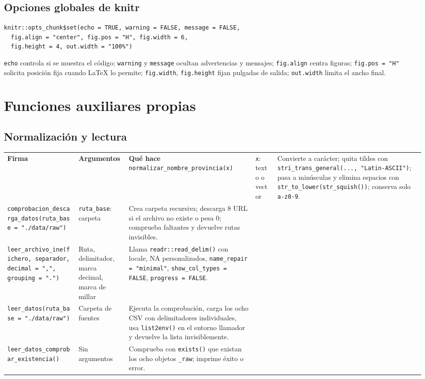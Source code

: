 \documentclass[10pt,a4paper]{article}
\newcommand{\code}[1]{\texttt{\small #1}}
\begin{document}
\subsection{Opciones globales de knitr}
\begin{lstlisting}
knitr::opts_chunk$set(echo = TRUE, warning = FALSE, message = FALSE,
  fig.align = "center", fig.pos = "H", fig.width = 6,
  fig.height = 4, out.width = "100%")
\end{lstlisting}
\code{echo} controla si se muestra el código; \code{warning} y \code{message} ocultan advertencias y mensajes; \code{fig.align} centra figuras; \code{fig.pos = "H"} solicita posición fija cuando LaTeX lo permite; \code{fig.width}, \code{fig.height} fijan pulgadas de salida; \code{out.width} limita el ancho final.

\section{Funciones auxiliares propias}
\subsection{Normalización y lectura}
\begin{longtable}{p{}p{}p{}}
\toprule\textbf{Firma} & \textbf{Argumentos} & \textbf{Qué hace}\
\midrule\endhead
\code{normalizar\_nombre\_provincia(x)} & \code{x}: texto o vector & Convierte a carácter; quita tildes con \code{stri\_trans\_general(..., "Latin-ASCII")}; pasa a minúsculas y elimina espacios con \code{str\_to\_lower(str\_squish())}; conserva solo \code{a-z0-9}.\\
\code{comprobacion\_descarga\_datos(ruta\_base = "./data/raw")} & \code{ruta\_base}: carpeta & Crea carpeta recursiva; descarga 8 URL si el archivo no existe o pesa 0; comprueba faltantes y devuelve rutas invisibles.\\
\code{leer\_archivo\_ine(fichero, separador, decimal = ",", grouping = ".")} & Ruta, delimitador, marca decimal, marca de millar & Llama \code{readr::read\_delim()} con locale, NA personalizados, \code{name\_repair = "minimal"}, \code{show\_col\_types = FALSE}, \code{progress = FALSE}.\\
\code{leer\_datos(ruta\_base = "./data/raw")} & Carpeta de fuentes & Ejecuta la comprobación, carga los ocho CSV con delimitadores individuales, usa \code{list2env()} en el entorno llamador y devuelve la lista invisiblemente.\\
\code{leer\_datos\_comprobar\_existencia()} & Sin argumentos & Comprueba con \code{exists()} que existan los ocho objetos \code{\_raw}; imprime éxito o error.\\
\bottomrule
\end{longtable}
\end{document}
